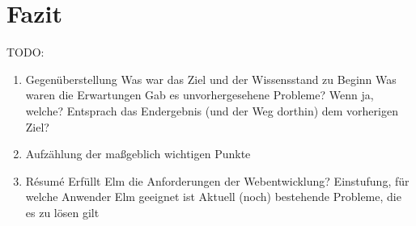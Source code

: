 \chapter{Fazit}
\label{chap:fazit}
TODO:
\begin{enumerate}
	\item{Gegenüberstellung}
		\subitem{-} Was war das Ziel und der Wissensstand zu Beginn
		\subitem{-} Was waren die Erwartungen
		\subitem{-} Gab es unvorhergesehene Probleme? Wenn ja, welche?
		\subitem{-} Entsprach das Endergebnis (und der Weg dorthin) dem vorherigen Ziel?
	\item Aufzählung der maßgeblich wichtigen Punkte
	\item Résumé
		\subitem{-} Erfüllt Elm die Anforderungen der Webentwicklung?
		\subitem{-} Einstufung, für welche Anwender Elm geeignet ist
		\subitem{-} Aktuell (noch) bestehende Probleme, die es zu lösen gilt
\end{enumerate}